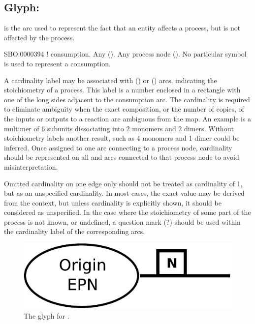 

\subsection{Glyph: }
\label{sec:consumption}

 is the arc used to represent the fact that an entity affects a process,
but is not affected by the process.

\begin{glyphDescription}
 \glyphSboTerm SBO:0000394 ! consumption.
 \glyphOrigin Any  ().
 \glyphTarget Any process node ().
 \glyphEndPoint No particular symbol is used to represent a consumption.
\end{glyphDescription}


A cardinality label may be associated with  () or 
 () arcs, indicating the stoichiometry of a process. This label is a number enclosed in a rectangle with one of the long sides adjacent to the consumption arc. The cardinality is 
required to eliminate ambiguity when the exact composition, or the number of 
copies, of the inputs or outputs to a reaction are ambiguous from the map. 
An example is a multimer of 6 subunits dissociating into 2 monomers and 2 
dimers. Without stoichiometry labels another result, such as 4 monomers and 1 
dimer could be inferred.
Once assigned to one arc connecting to a process node, cardinality should be represented on
all  and  arcs connected to that process
node to avoid misinterpretation.

Omitted cardinality on one edge only should not be treated as cardinality of 1, but
as an unspecified cardinality. In most cases, the exact value may be derived from the
context, but unless cardinality is explicitly shown, it should be considered as
unspecified. In the case where the stoichiometry of some part of the process is not
known, or undefined, a question mark (?) should be used within the cardinality label
of the corresponding arcs.

\begin{figure}[H]
  \centering
  \includegraphics[scale = 0.4]{images/consumption}
  \caption{The \PD glyph for .}
  \label{fig:consumption}
\end{figure}




